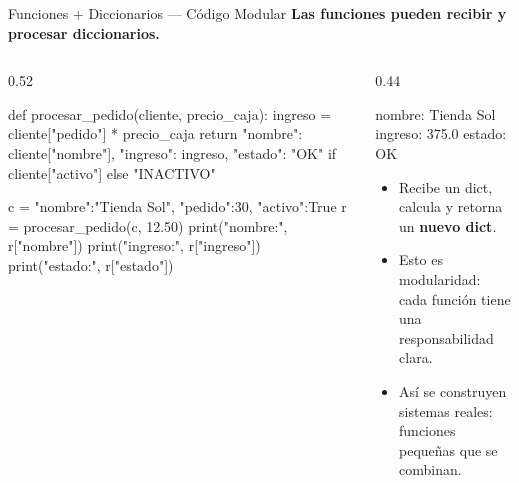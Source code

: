 \documentclass[aspectratio=169, 11pt]{beamer}
\begin{document}
\begin{frame}[fragile,shrink=31]{Funciones + Diccionarios --- Código Modular}
  \vspace{-6pt}
  {\footnotesize\color{arcaDark}\bfseries
    Las funciones pueden recibir y procesar diccionarios.}

  \vspace{2pt}
  \begin{columns}[T]
    \begin{column}{0.52\textwidth}
      \begin{pyblock}
def procesar_pedido(cliente, precio_caja):
    ingreso = cliente["pedido"] * precio_caja
    return {
        "nombre": cliente["nombre"],
        "ingreso": ingreso,
        "estado": "OK" if cliente["activo"] else "INACTIVO"
    }

c = {"nombre":"Tienda Sol", "pedido":30, "activo":True}
r = procesar_pedido(c, 12.50)
print("nombre:", r["nombre"])
print("ingreso:", r["ingreso"])
print("estado:", r["estado"])
      \end{pyblock}
    \end{column}

    \begin{column}{0.44\textwidth}
      \vspace{2pt}
      \begin{outputblock}
nombre: Tienda Sol
ingreso: 375.0
estado: OK
      \end{outputblock}

      \vspace{2pt}
      {\scriptsize\color{textMuted}
      \begin{itemize}\setlength{\itemsep}{3pt}
        \item[{\color{arcaRed}\scriptsize\faArrowRight}]
          Recibe un dict, calcula y retorna
          un \textbf{nuevo dict}.
        \item[{\color{arcaRed}\scriptsize\faArrowRight}]
          Esto es modularidad: cada función
          tiene una responsabilidad clara.
        \item[{\color{arcaRed}\scriptsize\faLightbulb}]
          Así se construyen sistemas reales:
          funciones pequeñas que se combinan.
      \end{itemize}
      }
    \end{column}
  \end{columns}
\end{frame}
\end{document}
